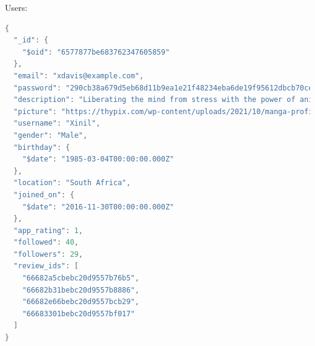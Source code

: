 Users:
\begin{mdframed}[backgroundcolor=yellow!20, innerleftmargin=10pt, innerrightmargin=10pt]
    \begin{lstlisting}[language=java]
      {
  "_id": {
    "$oid": "6577877be683762347605859"
  },
  "email": "xdavis@example.com",
  "password": "290cb38a679d5eb68d11b9ea1e21f48234eba6de19f95612dbcb70ce0c7e4e78",
  "description": "Liberating the mind from stress with the power of anime zen.",
  "picture": "https://thypix.com/wp-content/uploads/2021/10/manga-profile-picture-44.jpg",
  "username": "Xinil",
  "gender": "Male",
  "birthday": {
    "$date": "1985-03-04T00:00:00.000Z"
  },
  "location": "South Africa",
  "joined_on": {
    "$date": "2016-11-30T00:00:00.000Z"
  },
  "app_rating": 1,
  "followed": 40,
  "followers": 29,
  "review_ids": [
    "66682a5cbebc20d9557b76b5",
    "66682b31bebc20d9557b8886",
    "66682e66bebc20d9557bcb29",
    "66683301bebc20d9557bf017"
  ]
}
    \end{lstlisting}
\end{mdframed}

\newpage

